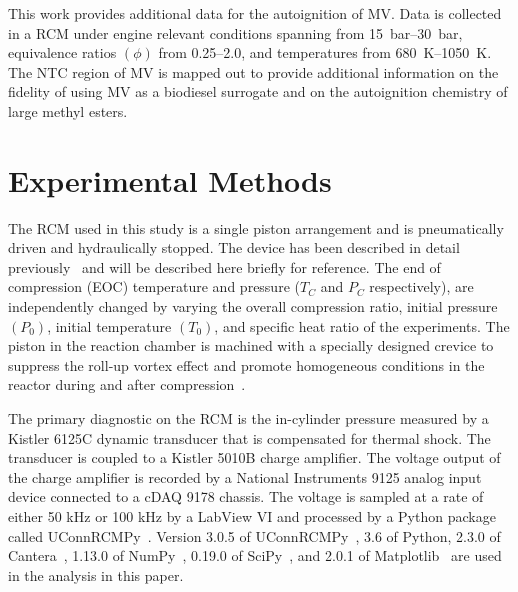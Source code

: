 \documentclass[letterpaper, review, sort&compress]{elsarticle}
\begin{document}
This work provides additional data for the autoignition of MV. Data is collected in a RCM under
engine relevant conditions spanning from \SIrange{15}{30}{\bar}, equivalence ratios \((\phi)\) from
\numrange{0.25}{2.0}, and temperatures from \SIrange{680}{1050}{\K}. The NTC region of MV is mapped
out to provide additional information on the fidelity of using MV as a biodiesel surrogate and on
the autoignition chemistry of large methyl esters.

\section{Experimental Methods}\label{sec:experimental-methods}

The RCM used in this study is a single piston arrangement and is pneumatically driven and
hydraulically stopped. The device has been described in detail previously~\cite{Mittal2007a} and
will be described here briefly for reference. The end of compression (EOC) temperature and pressure
(\(T_C\) and \(P_C\) respectively), are independently changed by varying the overall compression
ratio, initial pressure \((P_0)\), initial temperature \((T_0)\), and specific heat ratio of the
experiments. The piston in the reaction chamber is machined with a specially designed crevice to
suppress the roll-up vortex effect and promote homogeneous conditions in the reactor during and
after compression~\cite{Mittal2006}.

The primary diagnostic on the RCM is the in-cylinder pressure measured by a Kistler 6125C dynamic
transducer that is compensated for thermal shock. The transducer is coupled to a Kistler 5010B
charge amplifier. The voltage output of the charge amplifier is recorded by a National Instruments
9125 analog input device connected to a cDAQ 9178 chassis. The voltage is sampled at a rate of
either 50 kHz or 100 kHz by a LabView VI and processed by a Python package called
UConnRCMPy~\cite{Weber2016a}. Version 3.0.5 of UConnRCMPy~\cite{uconnrcmpy}, 3.6 of Python, 2.3.0
of Cantera~\cite{cantera}, 1.13.0 of NumPy~\cite{vanderWalt2011}, 0.19.0 of SciPy~\cite{Jones2001},
and 2.0.1 of Matplotlib~\cite{Hunter2007} are used in the analysis in this paper.
\end{document}

